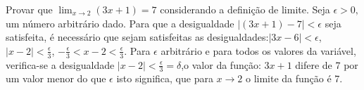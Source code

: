 \begin{ex}
Provar que $\lim_{x\rightarrow 2} (3x+1) = 7$ considerando a definição de limite.
Seja $\epsilon>0,$ um número arbitrário dado. Para que a desigualdade $\left|(3x+1)-7\right|<\epsilon$ seja satisfeita, é necessário que sejam satisfeitas as desigualdades:$\left|3x-6\right|<\epsilon$, $\left|x-2\right|<\frac{\epsilon}{3}$, $-\frac{\epsilon}{3}<x-2<\frac{\epsilon}{3}$. Para $\epsilon$ arbitrário e para todos os valores da variável, verifica-se a desigualdade $\left|x-2\right|<\frac{\epsilon}{3}=\delta$,o valor da função: $3x+1$ difere de 7 por um valor menor do que $\epsilon$ isto significa, que para $x\rightarrow 2 $ o limite da função é 7.
\end{ex}